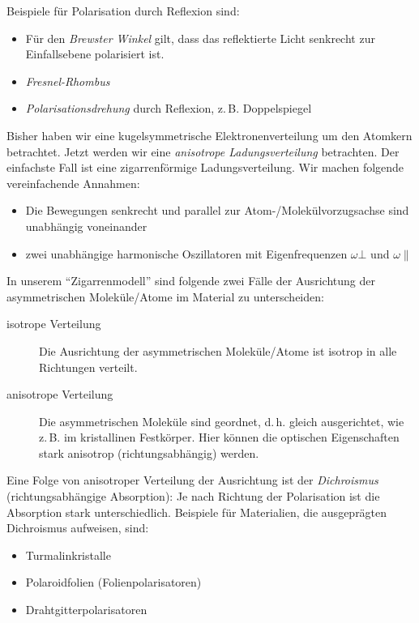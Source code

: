 Beispiele für Polarisation durch Reflexion sind:
\begin{itemize}
\item Für den \emph{Brewster Winkel} gilt, dass das reflektierte Licht senkrecht
zur Einfallsebene polarisiert ist.
\item \emph{Fresnel-Rhombus}
\item \emph{Polarisationsdrehung} durch Reflexion, z.\,B. Doppelspiegel
\end{itemize}


Bisher haben wir eine kugelsymmetrische Elektronenverteilung um den
Atomkern betrachtet. Jetzt werden wir eine \emph{anisotrope
Ladungsverteilung} betrachten. Der einfachste Fall ist eine
zigarrenförmige Ladungsverteilung.
Wir machen folgende vereinfachende Annahmen:
\begin{itemize}
\item Die Bewegungen senkrecht und parallel zur
  Atom-/Molekülvorzugsachse sind unabhängig voneinander 
\item zwei unabhängige harmonische Oszillatoren mit Eigenfrequenzen
$\omega\bot$%
und $\omega\parallel$%
\end{itemize}
In unserem \enquote{Zigarrenmodell} sind folgende zwei Fälle der
Ausrichtung der asymmetrischen Moleküle/Atome im Material zu
unterscheiden:
\begin{description}
\item[isotrope Verteilung] Die Ausrichtung der asymmetrischen
  Moleküle/Atome ist isotrop in alle Richtungen verteilt.
\item[anisotrope Verteilung] Die asymmetrischen Moleküle
  sind geordnet, d.\,h. gleich ausgerichtet, wie z.\,B. im
  kristallinen Festkörper. Hier können die optischen Eigenschaften
  stark anisotrop (richtungsabhängig) werden.
\end{description}
Eine Folge von anisotroper Verteilung der Ausrichtung ist der
\emph{Dichroismus} (richtungsabhängige Absorption):
Je nach Richtung der Polarisation ist die Absorption stark
unterschiedlich.
Beispiele für Materialien, die ausgeprägten Dichroismus aufweisen,
sind:
\begin{itemize}
\item Turmalinkristalle
\item Polaroidfolien (Folienpolarisatoren)
\item Drahtgitterpolarisatoren
\end{itemize}

